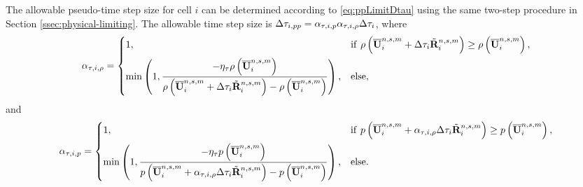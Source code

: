 The allowable pseudo-time step size for cell $i$ can be determined according to \eqref{eq:ppLimitDtau} using the same two-step procedure in Section \ref{ssec:physical-limiting}. The allowable time step size is $\mathrm\Delta \tau_{i,pp}= \alpha_{\tau,i,p}\alpha_{\tau,i,\rho} \mathrm\Delta  \tau_{i}$, 
where
\begin{equation}
	\alpha_{\tau,i,\rho} = \begin{dcases}
		1, & \mathrm{if} \ \rho\left(\overline{\mathbf{U}}^{n,s,m}_i + \mathrm\Delta \tau_{i} \tilde{\mathbf{R}}^{n,s,m}_i\right) \geq  \rho\left(\overline{\mathbf{U}}^{n,s,m}_i\right), \\
		\min\left(1, \dfrac{-\eta_\tau \rho\left(\overline{\mathbf{U}}^{n,s,m}_i\right)}{\rho \left(\overline{\mathbf{U}}^{n,s,m}_i + \mathrm\Delta \tau_{i} \tilde{\mathbf{R}}^{n,s,m}_i\right)-  \rho\left(\overline{\mathbf{U}}^{n,s,m}_i\right)} \right), &
		\mathrm{else},
	\end{dcases}
\end{equation}
and 
\begin{equation}
	\alpha_{\tau,i,p} = \begin{dcases}
		1, & \mathrm{if} \ p \left(\overline{\mathbf{U}}^{n,s,m}_i + \alpha_{\tau,i,\rho} \mathrm\Delta \tau_{i} \tilde{\mathbf{R}}^{n,s,m}_i\right) \geq  p \left(\overline{\mathbf{U}}^{n,s,m}_i\right), \\
		\min\left(1, \dfrac{-\eta_\tau p \left(\overline{\mathbf{U}}^{n,s,m}_i\right)}{p \left(\overline{\mathbf{U}}^{n,s,m}_i +  \alpha_{\tau,i,\rho} \mathrm\Delta \tau_{i} \tilde{\mathbf{R}}^{n,s,m}_i\right)-  p \left(\overline{\mathbf{U}}^{n,s,m}_i\right)} \right), &
		\mathrm{else}.
	\end{dcases}
\end{equation}

